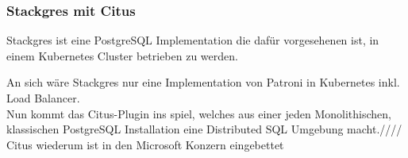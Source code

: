 \subsubsection{Stackgres mit Citus}
\begin{flushleft} 
    Stackgres ist eine PostgreSQL Implementation die dafür vorgesehenen ist, in einem Kubernetes Cluster betrieben zu werden.
\end{flushleft} 
\begin{flushleft}
    An sich wäre Stackgres nur eine Implementation von Patroni in Kubernetes inkl. Load Balancer.\\
    Nun kommt das Citus-Plugin ins spiel, welches aus einer jeden Monolithischen, klassischen PostgreSQL Installation eine Distributed SQL Umgebung macht.////
    Citus wiederum ist in den Microsoft Konzern eingebettet
\end{flushleft}
